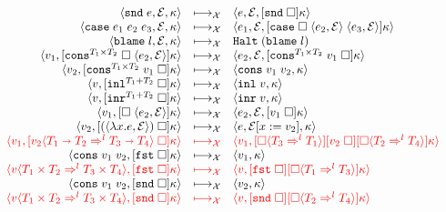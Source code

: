 \documentclass[acmsmall,review]{acmart}\settopmatter{printfolios=true,printccs=false,printacmref=false}
\newcommand{\plus}[0]{+}
\newcommand{\sOOinspect}[3]{\langle#1,#2,#3\rangle}
\newcommand{\sOOreturn}[2]{\langle#1,#2\rangle}
\newcommand{\sOOhalt}[1]{\mathtt{Halt} \; #1}
\newcommand{\POOfun}[2]{#1 \shortrightarrow #2}
\newcommand{\POOprod}[2]{#1 \times #2}
\newcommand{\POOsum}[2]{#1 \plus #2}
\newcommand{\eOOcdr}[1]{\mathtt{snd} \; #1}
\newcommand{\eOOcase}[3]{\mathtt{case} \; #1 \; #2 \; #3}
\newcommand{\eOOblame}[1]{\mathtt{blame} \; #1}
\newcommand{\cOOcast}[3]{#1 \Rightarrow^{#2} #3}
\newcommand{\oOOblame}[1]{\mathtt{blame} \; #1}
\newcommand{\vOOcast}[2]{#1\langle#2\rangle}
\newcommand{\vOOfun}[3]{\langle \lambda  #2. #3, #1 \rangle}
\newcommand{\vOOcons}[2]{\mathtt{cons}\;#1\;#2}
\newcommand{\vOOinl}[1]{\mathtt{inl}\;#1}
\newcommand{\vOOinr}[1]{\mathtt{inr}\;#1}
\newcommand{\kOOconsI}[5]{
	[\mathtt{cons}^{\POOprod{#1}{#2}} \; \square \; \langle#3,#4\rangle ]#5}
\newcommand{\kOOconsII}[4]{
	[\mathtt{cons}^{\POOprod{#1}{#2}} \; #3 \; \square]#4}
\newcommand{\kOOinl}[3]{[\mathtt{inl}^{\POOsum{#1}{#2}}\; \square]#3}
\newcommand{\kOOinr}[3]{[\mathtt{inr}^{\POOsum{#1}{#2}}\; \square]#3}
\newcommand{\kOOappI}[3]{
  [\square \; \langle#1,#2\rangle]#3
}
\newcommand{\kOOappII}[2]{
  [#1 \; \square]#2}
\newcommand{\kOOcar}[1]{[\mathtt{fst} \; \square]#1}
\newcommand{\kOOcdr}[1]{[\mathtt{snd} \; \square]#1}
\newcommand{\kOOcaseI}[4]{
  [\mathtt{case} \; \square \; \langle#1,#3\rangle \; \langle#2,#3\rangle ]#4}
\newcommand{\kOOcast}[2]{
  [\square \langle #1 \rangle]#2}
\newcommand{\redrule}[3]{#1 & \longmapsto_\mathcal{X} & #2 & #3\\}
\newcommand{\hiredrule}[3]{\highlight{#1} & \highlight{\longmapsto_\mathcal{X}} 
& \highlight{#2} & \highlight{#3} \\}
\newcommand{\highlight}[1]{{\color{red} #1}}
\begin{document}
\begin{figure}
\[\begin{array}{rclr}
\redrule{
  \sOOinspect{\eOOcdr{e}}{\mathcal{E}}{\kappa}}{
  \sOOinspect{e}{\mathcal{E}}{\kOOcdr{\kappa}}}{}

\redrule{
\sOOinspect{\eOOcase{e_1}{e_2}{e_3}}{\mathcal{E}}{\kappa}}{
\sOOinspect{e_1}{\mathcal{E}}{\kOOcaseI{e_2}{e_3}{\mathcal{E}}{\kappa}}}{}

\redrule{
\sOOinspect{\eOOblame{l}}{\mathcal{E}}{\kappa}}{
\sOOhalt{(\oOOblame{l})}}{}

\redrule{
\sOOreturn{v_1}{\kOOconsI{T_1}{T_2}{e_2}{\mathcal{E}}{\kappa}}}{
\sOOinspect{e_2}{\mathcal{E}}{\kOOconsII{T_1}{T_2}{v_1}{\kappa}}}{}

\redrule{
\sOOreturn{v_2}{\kOOconsII{T_1}{T_2}{v_1}{\kappa}}}{
\sOOreturn{\vOOcons{v_1}{v_2}}{\kappa}}{}

\redrule{
\sOOreturn{v}{\kOOinl{T_1}{T_2}{\kappa}}}{
\sOOreturn{\vOOinl{v}}{\kappa}}{}

\redrule{
\sOOreturn{v}{\kOOinr{T_1}{T_2}{\kappa}}}{
\sOOreturn{\vOOinr{v}}{\kappa}}{}

\redrule{
\sOOreturn{v_1}{\kOOappI{e_2}{\mathcal{E}}{\kappa}}}{
\sOOinspect{e_2}{\mathcal{E}}{\kOOappII{v_1}{\kappa}}}{}

\redrule{
\sOOreturn{v_2}{\kOOappII{(\vOOfun{\mathcal{E}}{x}{e})}{\kappa}}}{
\sOOinspect{e}{\mathcal{E}[x:=v_2]}{\kappa}}{}
  \hiredrule{
    \sOOreturn{v_1}{
      \kOOappII{\vOOcast{v_2}{
          \cOOcast{\POOfun{T_1}{T_2}}{l}{\POOfun{T_3}{T_4}}
      }}{\kappa}
    }
  }{
    \sOOreturn{v_1}{
      \kOOcast{\cOOcast{T_3}{l}{T_1}}{
        \kOOappII{v_2}{
          \kOOcast{\cOOcast{T_2}{l}{T_4}}{\kappa}
        }
      }
    }
  }{}
  \redrule{
  \sOOreturn{
    \vOOcons{v_1}{v_2}
  }{\kOOcar{\kappa}}
  }{
  \sOOreturn{v_1}{\kappa}
  }{}
  \hiredrule{
    \sOOreturn{
      \vOOcast{v}{\cOOcast{\POOprod{T_1}{T_2}}{l}{
          \POOprod{T_3}{T_4}}}
    }{\kOOcar{\kappa}}
  }{
    \sOOreturn{v}{
      \kOOcar{
        \kOOcast{\cOOcast{T_1}{l}{T_3}}{\kappa}
      }}
  }{}
  \redrule{
  \sOOreturn{
  \vOOcons{v_1}{v_2}
  }{\kOOcdr{\kappa}}
  }{
  \sOOreturn{v_2}{\kappa}
  }{}
  
  \hiredrule{
    \sOOreturn{
      \vOOcast{v}{\cOOcast{\POOprod{T_1}{T_2}}{l}{
          \POOprod{T_3}{T_4}}}
    }{\kOOcdr{\kappa}}
  }{
    \sOOreturn{v}{
      \kOOcdr{\kOOcast{\cOOcast{T_2}{l}{T_4}}{\kappa}}}
  }{}


\end{array}\]
\end{figure}
\end{document}
